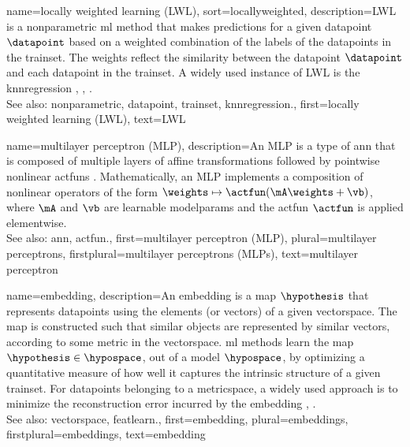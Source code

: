 {name={locally weighted learning (LWL)},
sort={locallyweighted},
	description={LWL is a \gls{nonparametric} \gls{ml} method 
		that makes \glspl{prediction} for a given \gls{datapoint} $\datapoint$ based on a 
		weighted combination of the \glspl{label} of the \glspl{datapoint} in the \gls{trainset}. 
		The weights reflect the similarity between the \gls{datapoint} $\datapoint$ and each 
		\gls{datapoint} in the \gls{trainset}. A widely used instance of LWL is the
		\gls{knnregression} \cite{MLBasics}, \cite{BishopBook}, \cite{LocallyWeightedLearning}.
				\\
		See also: \gls{nonparametric}, \gls{datapoint}, \gls{trainset}, \gls{knnregression}.}, 
	first={locally weighted learning (LWL)},
	text={LWL} 
}

{name={multilayer perceptron (MLP)},
	description={An MLP is a type of 
		\gls{ann} that is composed of multiple \glspl{layer} of affine 
		transformations followed by pointwise nonlinear \glspl{actfun} \cite{Goodfellow-et-al-2016}.
		Mathematically, an MLP implements a composition of nonlinear \glspl{operator} of the form
		$\weights \mapsto \actfun(\mA \weights + \vb)$, where $\mA$ and $\vb$ are 
		learnable \glspl{modelparam} and the \gls{actfun} $\actfun$ is applied elementwise. 
		\\
		See also: \gls{ann}, \gls{actfun}.},
	first={multilayer perceptron (MLP)},
	plural={multilayer perceptrons},
	firstplural={multilayer perceptrons (MLPs)},
	text={multilayer perceptron}
}

{name={embedding},
	description={An  embedding is a \gls{map} $\hypothesis$ that represents 
		\glspl{datapoint} using the elements (or \glspl{vector}) of a given \gls{vectorspace}. 
		The \gls{map} is constructed such that similar objects are represented by
		similar \glspl{vector}, according to some \gls{metric} in the \gls{vectorspace}. 
		\Gls{ml} methods learn the \gls{map} $\hypothesis \in \hypospace$, out of a \gls{model} $\hypospace$, 
		by optimizing a quantitative \gls{measure} of how well it captures the intrinsic structure of a given 
		\gls{trainset}. For \glspl{datapoint} belonging to a \gls{metricspace}, a widely used approach is to 
		minimize the reconstruction error incurred by the embedding \cite{Goodfellow-et-al-2016}, \cite[Ch. 13]{BishopDeepLearning}.		
		\\
		See also: \gls{vectorspace}, \gls{featlearn}.},
	first={embedding},
	plural={embeddings},
	firstplural={embeddings},
	text={embedding}
}

